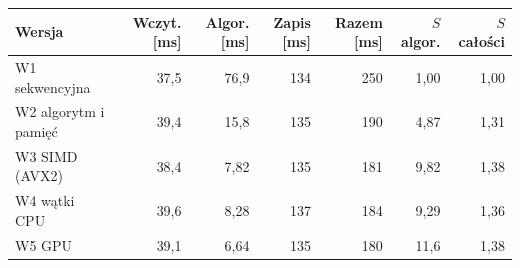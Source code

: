 \begin{tabular}{lrrrrrr}
\toprule
Wersja & Wczyt. [ms] & Algor. [ms] & Zapis [ms] & Razem [ms] & $S$ algor. & $S$ całości \\
\midrule
W1 sekwencyjna & 37,5 & 76,9 & 134 & 250 & 1,00 & 1,00 \\
W2 algorytm i pamięć & 39,4 & 15,8 & 135 & 190 & 4,87 & 1,31 \\
W3 SIMD (AVX2) & 38,4 & 7,82 & 135 & 181 & 9,82 & 1,38 \\
W4 wątki CPU & 39,6 & 8,28 & 137 & 184 & 9,29 & 1,36 \\
W5 GPU & 39,1 & 6,64 & 135 & 180 & 11,6 & 1,38 \\
\bottomrule
\end{tabular}
